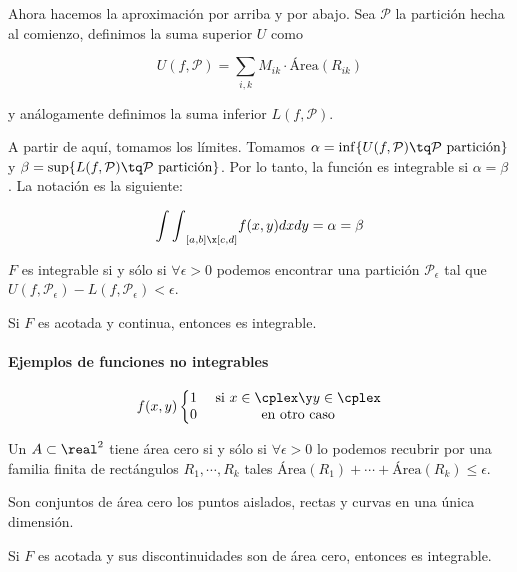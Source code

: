 \documentclass[nochap]{apuntes}
\begin{document}
Ahora hacemos la aproximación por arriba y por abajo. Sea $\mathcal{P}$ la partición hecha al comienzo, definimos la suma superior $U$ como

\[ U(f,\mathcal{P}) = \sum_{i,k} M_{ik} \cdot \text{Área}(R_{ik}) \]

y análogamente definimos la suma inferior $L(f,\mathcal{P})$.

A partir de aquí, tomamos los límites. Tomamos $\alpha = \inf\{U( f, \mathcal{P})\tq \mathcal{P} \text{ partición}\}$ y $\beta = \sup\{L(f, \mathcal{P})\tq \mathcal{P} \text{ partición}\}$. Por lo tanto, la función es integrable si $\alpha=\beta$. La notación es la siguiente:

\[ {\int\int}_{[a,b]\x[c,d]}f(x,y)dxdy=\alpha = \beta \]

\begin{theorem}
$F$ es integrable si y sólo si $\forall \epsilon > 0$ podemos encontrar una partición $\mathcal{P}_\epsilon$ tal que $U(f,\mathcal{P}_\epsilon) - L(f,\mathcal{P}_\epsilon) < \epsilon$.
\end{theorem}

\begin{theorem}
Si $F$ es acotada y continua, entonces es integrable.
\end{theorem}

\paragraph{Ejemplos de funciones no integrables} 

\[ f(x,y) \left\{ \begin{matrix}
1 &\text{ si } x\in\cplex \y y\in\cplex \\
0&\text{ en otro caso}
\end{matrix}\right.\]

\begin{defn}
Un $A\subset \real^2$ tiene área cero si y sólo si $\forall\epsilon > 0$ lo podemos recubrir por una familia finita de rectángulos $R_1,\cdots,R_k$ tales $\text{Área}(R_1) +\cdots + \text{Área}(R_k) ≤ \epsilon$.

Son conjuntos de área cero los puntos aislados, rectas y curvas en una única dimensión.
\end{defn}

\begin{theorem}
Si $F$ es acotada y sus discontinuidades son de área cero, entonces es integrable.
\end{theorem}
\end{document}
